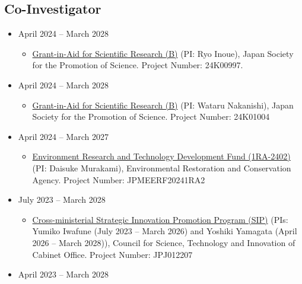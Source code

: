 \documentclass[
]{book}
\providecommand{\tightlist}{%
  \setlength{\itemsep}{0pt}\setlength{\parskip}{0pt}}
\begin{document}
\subsection*{Co-Investigator}\label{co-investigator}

\begin{itemize}
\tightlist
\item
  April 2024 -- March 2028

  \begin{itemize}
  \tightlist
  \item
    \href{https://kaken.nii.ac.jp/en/grant/KAKENHI-PROJECT-24K00997/}{Grant-in-Aid for Scientific Research (B)} (PI: Ryo Inoue),
    Japan Society for the Promotion of Science.
    Project Number: 24K00997.
  \end{itemize}
\item
  April 2024 -- March 2028

  \begin{itemize}
  \tightlist
  \item
    \href{https://kaken.nii.ac.jp/en/grant/KAKENHI-PROJECT-24K01004/}{Grant-in-Aid for Scientific Research (B)} (PI: Wataru Nakanishi),
    Japan Society for the Promotion of Science.
    Project Number: 24K01004
  \end{itemize}
\item
  April 2024 -- March 2027

  \begin{itemize}
  \tightlist
  \item
    \href{https://www.erca.go.jp/suishinhi/index.html}{Environment Research and Technology Development Fund (1RA-2402)} (PI: Daisuke Murakami),
    Environmental Restoration and Conservation Agency.
    Project Number: JPMEERF20241RA2
  \end{itemize}
\item
  July 2023 -- March 2028

  \begin{itemize}
  \tightlist
  \item
    \href{https://www.jst.go.jp/sip/sems/index.html}{Cross-ministerial Strategic Innovation Promotion Program (SIP)} (PIs: Yumiko Iwafune (July 2023 -- March 2026) and Yoshiki Yamagata (April 2026 -- March 2028)),
    Council for Science, Technology and Innovation of Cabinet Office.
    Project Number: JPJ012207
  \end{itemize}
\item
  April 2023 -- March 2028


\end{itemize}
\end{document}
